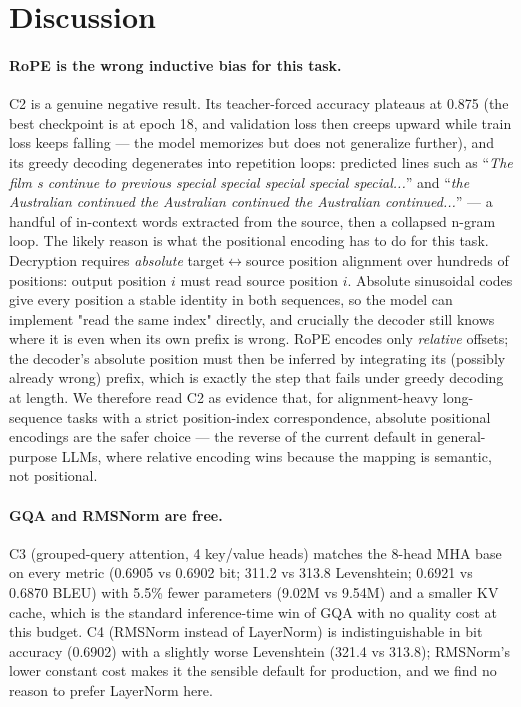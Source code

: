 \documentclass[11pt]{article}
\begin{document}
\section{Discussion}
\label{sec:discussion}
\paragraph{RoPE is the wrong inductive bias for this task.}
C2 is a genuine negative result. Its teacher-forced accuracy plateaus at 0.875
(the best checkpoint is at epoch 18, and validation loss then creeps upward while
train loss keeps falling --- the model memorizes but does not generalize further),
and its greedy decoding degenerates into repetition loops: predicted lines such as
``\textit{The film s continue to previous special special special special
special...}'' and ``\textit{the Australian continued the Australian continued the
Australian continued...}'' --- a handful of in-context words extracted from the
source, then a collapsed n-gram loop. The likely reason is what the positional
encoding has to do for this task. Decryption requires \emph{absolute}
target$\leftrightarrow$source position alignment over hundreds of positions:
output position $i$ must read source position $i$. Absolute sinusoidal codes give
every position a stable identity in both sequences, so the model can implement
"read the same index" directly, and crucially the decoder still knows where it is
even when its own prefix is wrong. RoPE encodes only \emph{relative} offsets;
the decoder's absolute position must then be inferred by integrating its (possibly
already wrong) prefix, which is exactly the step that fails under greedy decoding
at length. We therefore read C2 as evidence that, for alignment-heavy
long-sequence tasks with a strict position-index correspondence, absolute
positional encodings are the safer choice --- the reverse of the current default
in general-purpose LLMs, where relative encoding wins because the mapping is
semantic, not positional.

\paragraph{GQA and RMSNorm are free.}
C3 (grouped-query attention, 4 key/value heads) matches the 8-head MHA base on
every metric (0.6905 vs 0.6902 bit; 311.2 vs 313.8 Levenshtein; 0.6921 vs 0.6870
BLEU) with 5.5\% fewer parameters (9.02M vs 9.54M) and a smaller KV cache, which
is the standard inference-time win of GQA with no quality cost at this budget.
C4 (RMSNorm instead of LayerNorm) is indistinguishable in bit accuracy (0.6902)
with a slightly worse Levenshtein (321.4 vs 313.8); RMSNorm's lower constant
cost makes it the sensible default for production, and we find no reason to
prefer LayerNorm here.
\end{document}
